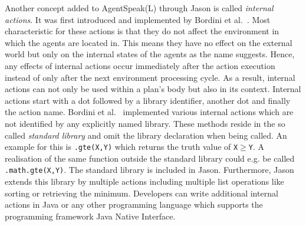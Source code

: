 Another concept added to AgentSpeak(L) through Jason is called \emph{internal actions}. It was first introduced and implemented by Bordini et al.~\cite{bordini_agentspeak_2002}. Most characteristic for these actions is that they do not affect the environment in which the agents are located in. This means they have no effect on the external world but only on the internal states of the agents as the name suggests. Hence, any effects of internal actions occur immediately after the action execution instead of only after the next environment processing cycle. As a result, internal actions can not only be used within a plan's body but also in its context. %
Internal actions start with a dot followed by a library identifier, another dot and finally the action name. Bordini et al.~\cite{bordini_agentspeak_2002} implemented various internal actions which are not identified by any explicitly named library. These methods reside in the so called \emph{standard library} and omit the library declaration when being called. An example for this is \texttt{.gte(X,Y)} which returns the truth value of \texttt{X}$\geq$\texttt{Y}. A realisation of the same function outside the standard library could e.g. be called \texttt{.math.gte(X,Y)}. The standard library is included in Jason. Furthermore, Jason extends this library by multiple actions including multiple list operations like sorting or retrieving the minimum. Developers can write additional internal actions in Java or any other programming language which supports the programming framework Java Native Interface. %

